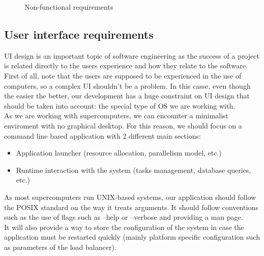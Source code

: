 \begin{figure}[ht!]
\begin{center}
\begin{tabular}{||c | c | p{7cm} | c||}
    \end{tabular}

  \end{center}

  \caption{Non-functional requirements}
  \label{non_functional:fig}
\end{figure}

\subsection{User interface requirements}

UI design is an important topic of software engineering as the success of a
project is related directly to the users experience and how they relate to the
software.\\

First of all, note that the users are supposed to be experienced in the use of
computers, so a complex UI shouldn't be a problem. In this casse, even though
the easier the better, our development has a huge constraint on UI design that
should be taken into account: the special type of OS we are working with.\\

As we are working with supercomputers, we can encounter a minimalist enviroment
with no graphical desktop. For this reason, we should focus on a command line
based application with 2 different main sections:\\
\begin{itemize}
  \item Application launcher (resource allocation, parallelism model, etc.)
  \item Runtime interaction with the system (tasks management, database
  queries, etc.)
\end{itemize}

As most supercomputers run UNIX-based systems, our application should follow
the POSIX\cite{POSIX_arguments} standard on the way it treats arguments.
It should follow conventions such as the use of flags such as --help or
--verbose and providing a man page.\\

It will also provide a way to store the configuration of the system in case
the application must be restarted quickly (mainly platform specific
configuration such as parameters of the load balancer). \\
